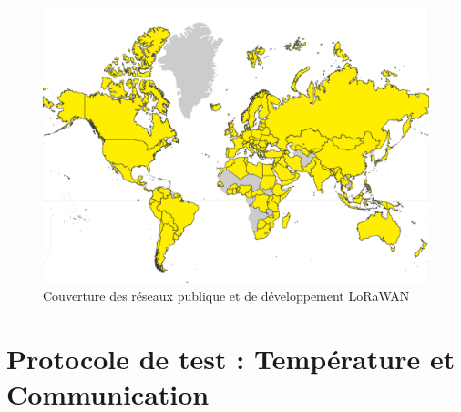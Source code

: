 \begin{figure}[h!]
  \centering
  \includegraphics[scale=0.5]{img/state_of_the_art/lora_cov_dev.png}
  \caption{Couverture des réseaux publique et de développement LoRaWAN \cite{lora_map}}
  \label{fig:cov_lora_map}
\end{figure}





\chapter{Protocole de test : Température et Communication }
\label{ap:teeeest}


